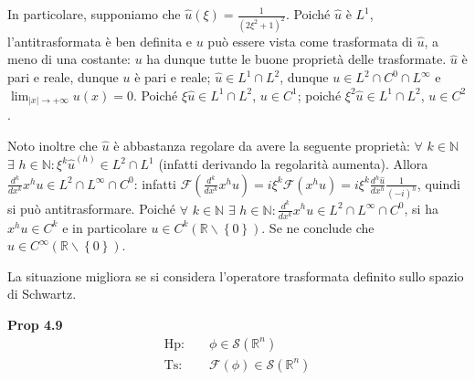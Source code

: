 \documentclass{article}
\begin{document}
\begin{enumerate}
In particolare, supponiamo che $\hat{u}\left( \xi \right) =\frac{1}{\left(
2\xi ^{2}+1\right) ^{2}}$. Poich\'{e} $\hat{u}$ \`{e} $L^{1}$,
l'antitrasformata \`{e} ben definita e $u$ pu\`{o} essere vista come
trasformata di $\hat{u}$, a meno di una costante: $u$ ha dunque tutte le
buone propriet\`{a} delle trasformate. $\hat{u}$ \`{e} pari e reale, dunque $%
u$ \`{e} pari e reale; $\hat{u}\in L^{1}\cap L^{2}$, dunque $u\in L^{2}\cap
C^{0}\cap L^{\infty }$ e $\lim_{\left\vert x\right\vert \rightarrow +\infty
}u\left( x\right) =0$. Poich\'{e} $\xi \hat{u}\in L^{1}\cap L^{2}$, $u\in
C^{1}$; poich\'{e} $\xi ^{2}\hat{u}\in L^{1}\cap L^{2}$, $u\in C^{2}$.

Noto inoltre che $\hat{u}$ \`{e} abbastanza regolare da avere la seguente
propriet\`{a}: $\forall $ $k\in 
\mathbb{N}
$ $\exists $ $h\in 
\mathbb{N}
:\xi ^{k}\hat{u}^{\left( h\right) }\in L^{2}\cap L^{1}$ (infatti derivando
la regolarit\`{a} aumenta). Allora $\frac{d^{k}}{dx^{k}}x^{h}u\in L^{2}\cap
L^{\infty }\cap C^{0}$: infatti $\mathcal{F}\left( \frac{d^{k}}{dx^{k}}%
x^{h}u\right) =i\xi ^{k}\mathcal{F}\left( x^{h}u\right) =i\xi ^{k}\frac{d^{h}%
\hat{u}}{dx^{h}}\frac{1}{\left( -i\right) ^{h}}$, quindi si pu\`{o}
antitrasformare. Poich\'{e} $\forall $ $k\in 
\mathbb{N}
$ $\exists $ $h\in 
\mathbb{N}
:\frac{d^{k}}{dx^{k}}x^{h}u\in L^{2}\cap L^{\infty }\cap C^{0}$, si ha $%
x^{h}u\in C^{k}$ e in particolare $u\in C^{k}\left( 
\mathbb{R}
\backslash \left\{ 0\right\} \right) $. Se ne conclude che $u\in C^{\infty
}\left( 
\mathbb{R}
\backslash \left\{ 0\right\} \right) $.
\end{enumerate}

La situazione migliora se si considera l'operatore trasformata definito
sullo spazio di Schwartz.

\textbf{Prop 4.9} 
\begin{eqnarray*}
\text{Hp}\text{: } &&\phi \in \mathcal{S}\left( 
\mathbb{R}
^{n}\right) \\
\text{Ts}\text{: } &&\mathcal{F}\left( \phi \right) \in \mathcal{S}\left( 
\mathbb{R}
^{n}\right)
\end{eqnarray*}
\end{document}
